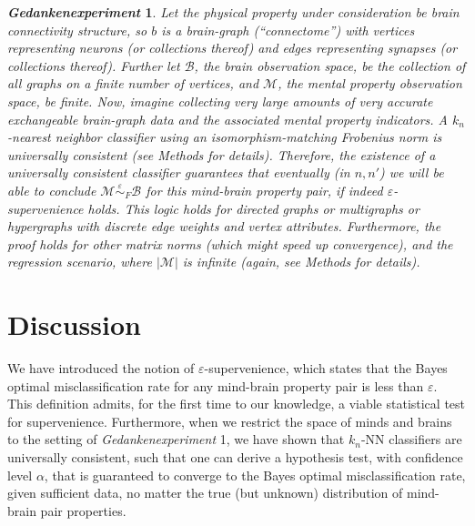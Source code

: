 \documentclass{article}
\newcommand{\mB}{\mathcal{B}}
\newcommand{\mM}{\mathcal{M}}
\newcommand{\eps}{\varepsilon}
\providecommand{\mc}[1]{\mathcal{#1}}
\newcommand{\MeB}{\mM \overset{\varepsilon}{{\sim}}_{F} \mB}
\newtheorem{thex}{\emph{Gedankenexperiment}}
\begin{document}
\begin{thex}
Let the physical property under consideration be brain connectivity structure, so $b$ is a brain-graph (``connectome'') with vertices representing neurons (or collections thereof) and edges representing synapses (or collections thereof). Further let $\mB$, the brain observation space, be the collection of all graphs on a finite number of vertices, and $\mc{M}$, the mental property observation space, be finite. Now, imagine collecting very large amounts of very accurate exchangeable  brain-graph data and the associated mental property indicators. A $k_n$-nearest neighbor classifier using an isomorphism-matching Frobenius norm is universally consistent (see Methods for details). Therefore, %
the existence of a universally consistent classifier guarantees that eventually (in $n,n'$) we will be able to conclude $\MeB$ for this mind-brain property pair, if indeed $\varepsilon$-supervenience holds. This logic holds for directed graphs or multigraphs or hypergraphs with discrete edge weights and vertex attributes. Furthermore, the proof holds for other matrix norms (which might speed up convergence), and the regression scenario, where $|\mM|$ is infinite (again, see Methods for details).  
\end{thex}


\section*{Discussion}


We have introduced the notion of $\eps$-supervenience, which states that the Bayes optimal misclassification rate for any mind-brain property pair is less than $\eps$.  This definition admits, for the first time to our knowledge, a viable statistical test for supervenience.  Furthermore, when we restrict the space of minds and brains to the setting of \emph{Gedankenexperiment}  1, we have shown that $k_n$-NN classifiers are universally consistent, such that one can derive a hypothesis test, with confidence level $\alpha$, that is guaranteed to converge to the Bayes optimal misclassification rate, given sufficient data, no matter the true (but unknown) distribution of mind-brain pair properties.  
\end{document}
